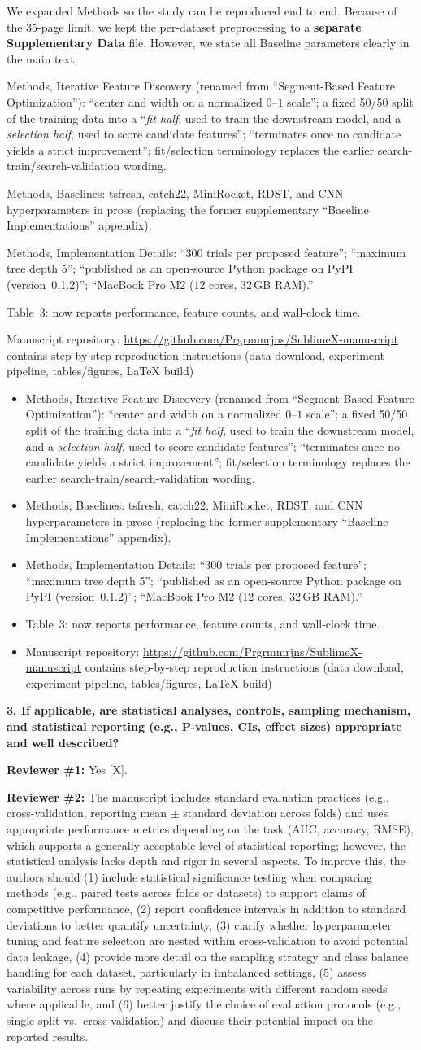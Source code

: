 \documentclass[11pt]{article}
\makeatletter
\newcommand{\rsp}{\par\vspace{0.9em}}
\newcommand{\rcbothq}[3]{%
  \begin{reviewerbox}\textbf{#1}\par\smallskip\textbf{Reviewer \#1:} #2\par\smallskip%
  \textbf{Reviewer \#2:} #3\end{reviewerbox}}
\newcommand{\response}[2]{%
  \begin{responsebox}#1%
  \def\@responseitems{#2}%
  \ifx\@responseitems\empty\else\begin{itemize}[nosep,leftmargin=1.2em]#2\end{itemize}\fi
  \end{responsebox}\rsp}
\makeatother
\begin{document}
\response{We expanded Methods so the study can be reproduced end to end. Because of the
  35-page limit, we kept the per-dataset preprocessing to a \textbf{separate Supplementary Data} file.
  However, we state all Baseline parameters clearly in the main text. 
  }{
  \item Methods, Iterative Feature Discovery (renamed from ``Segment-Based Feature Optimization''):
    ``center and width on a normalized $0$--$1$ scale'';
    a fixed 50/50 split of the training data into a ``\emph{fit half}, used to train the downstream
    model, and a \emph{selection half}, used to score candidate features'';
    ``terminates once no candidate yields a strict improvement''; fit/selection terminology replaces
    the earlier search-train/search-validation wording.
  \item Methods, Baselines: tsfresh, catch22, MiniRocket, RDST, and CNN hyperparameters in prose
    (replacing the former supplementary ``Baseline Implementations'' appendix).
  \item Methods, Implementation Details: ``300 trials per proposed feature''; ``maximum tree depth
    5''; ``published as an open-source Python package on PyPI (version~0.1.2)''; ``MacBook Pro M2
    (12 cores, 32\,GB RAM).''
  \item Table~3: now reports performance, feature counts, and wall-clock time.
  \item Manuscript repository: \url{https://github.com/Prgrmmrjns/SublimeX-manuscript} contains 
  step-by-step reproduction instructions (data download, experiment
    pipeline, tables/figures, LaTeX build)
}

\rcbothq{3. If applicable, are statistical analyses, controls, sampling mechanism, and statistical
reporting (e.g., P-values, CIs, effect sizes) appropriate and well described?}{Yes [X].}
{The manuscript includes standard evaluation practices (e.g., cross-validation, reporting mean
$\pm$ standard deviation across folds) and uses appropriate performance metrics depending on the
task (AUC, accuracy, RMSE), which supports a generally acceptable level of statistical reporting;
however, the statistical analysis lacks depth and rigor in several aspects.
To improve this, the authors should (1) include statistical significance testing when comparing
methods (e.g., paired tests across folds or datasets) to support claims of competitive
performance, (2) report confidence intervals in addition to standard deviations to better
quantify uncertainty, (3) clarify whether hyperparameter tuning and feature selection are nested
within cross-validation to avoid potential data leakage, (4) provide more detail on the sampling
strategy and class balance handling for each dataset, particularly in imbalanced settings, (5)
assess variability across runs by repeating experiments with different random seeds where
applicable, and (6) better justify the choice of evaluation protocols (e.g., single split
vs.\ cross-validation) and discuss their potential impact on the reported results.}
\end{document}
